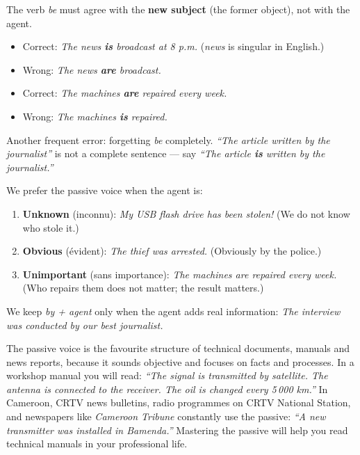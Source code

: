 \documentclass[11pt]{article}
\newcounter{popsec}
\newcounter{popsub}
\newcommand{\courssub}[1]{%
  \stepcounter{popsub}%
  \par\vspace{9pt}\noindent{\popxbold\fontsize{11.5}{13}\selectfont\color{popink}{\color{poporange}\thepopsec.\thepopsub}\hspace{6pt}#1}\par\nopagebreak\vspace{4pt}
}
\begin{document}
\begin{attention}
The verb \emph{be} must agree with the \textbf{new subject} (the former object), not with the agent.
\begin{itemize}
\item Correct: \emph{The news \textbf{is} broadcast at 8 p.m.} (\emph{news} is singular in English.)
\item Wrong: \emph{The news \textbf{are} broadcast.}
\item Correct: \emph{The machines \textbf{are} repaired every week.}
\item Wrong: \emph{The machines \textbf{is} repaired.}
\end{itemize}
Another frequent error: forgetting \emph{be} completely. \emph{``The article written by the journalist''} is not a complete sentence — say \emph{``The article \textbf{is} written by the journalist.''}
\end{attention}

\courssub{When Do We Use the Passive Voice?}

\begin{propriete}
We prefer the passive voice when the agent is:
\begin{enumerate}
\item \textbf{Unknown} (inconnu): \emph{My USB flash drive has been stolen!} (We do not know who stole it.)
\item \textbf{Obvious} (évident): \emph{The thief was arrested.} (Obviously by the police.)
\item \textbf{Unimportant} (sans importance): \emph{The machines are repaired every week.} (Who repairs them does not matter; the result matters.)
\end{enumerate}
We keep \emph{by + agent} only when the agent adds real information: \emph{The interview was conducted by our best journalist.}
\end{propriete}

\begin{savaistu}
The passive voice is the favourite structure of technical documents, manuals and news reports, because it sounds objective and focuses on facts and processes. In a workshop manual you will read: \emph{``The signal is transmitted by satellite. The antenna is connected to the receiver. The oil is changed every 5\,000 km.''} In Cameroon, CRTV news bulletins, radio programmes on CRTV National Station, and newspapers like \emph{Cameroon Tribune} constantly use the passive: \emph{``A new transmitter was installed in Bamenda.''} Mastering the passive will help you read technical manuals in your professional life.
\end{savaistu}
\end{document}
